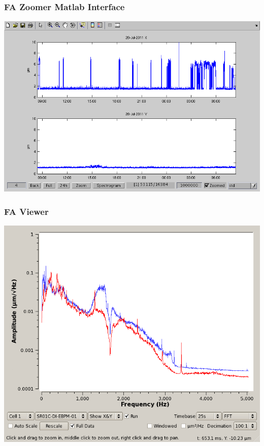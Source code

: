 \documentclass{beamer}
\begin{document}
\begin{frame}\frametitle{FA Zoomer Matlab Interface}
\includegraphics[width=\linewidth]{fa-zoomer}
\end{frame}


\begin{frame}\frametitle{FA Viewer}
\begin{center}
\includegraphics[width=.85\linewidth]{WEPMN004f6}
\end{center}
\end{frame}
\end{document}
